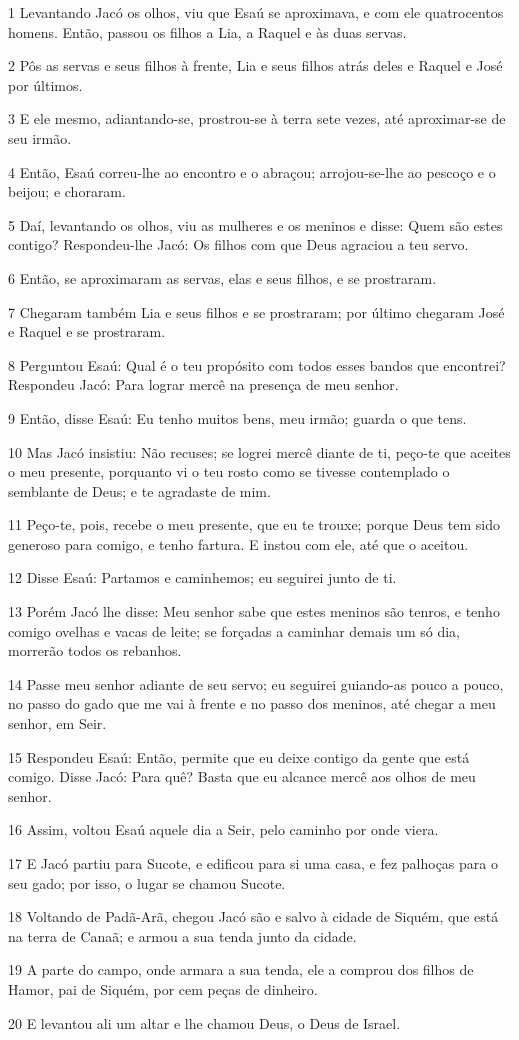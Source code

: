 \par 1 Levantando Jacó os olhos, viu que Esaú se aproximava, e com ele quatrocentos homens. Então, passou os filhos a Lia, a Raquel e às duas servas.
\par 2 Pôs as servas e seus filhos à frente, Lia e seus filhos atrás deles e Raquel e José por últimos.
\par 3 E ele mesmo, adiantando-se, prostrou-se à terra sete vezes, até aproximar-se de seu irmão.
\par 4 Então, Esaú correu-lhe ao encontro e o abraçou; arrojou-se-lhe ao pescoço e o beijou; e choraram.
\par 5 Daí, levantando os olhos, viu as mulheres e os meninos e disse: Quem são estes contigo? Respondeu-lhe Jacó: Os filhos com que Deus agraciou a teu servo.
\par 6 Então, se aproximaram as servas, elas e seus filhos, e se prostraram.
\par 7 Chegaram também Lia e seus filhos e se prostraram; por último chegaram José e Raquel e se prostraram.
\par 8 Perguntou Esaú: Qual é o teu propósito com todos esses bandos que encontrei? Respondeu Jacó: Para lograr mercê na presença de meu senhor.
\par 9 Então, disse Esaú: Eu tenho muitos bens, meu irmão; guarda o que tens.
\par 10 Mas Jacó insistiu: Não recuses; se logrei mercê diante de ti, peço-te que aceites o meu presente, porquanto vi o teu rosto como se tivesse contemplado o semblante de Deus; e te agradaste de mim.
\par 11 Peço-te, pois, recebe o meu presente, que eu te trouxe; porque Deus tem sido generoso para comigo, e tenho fartura. E instou com ele, até que o aceitou.
\par 12 Disse Esaú: Partamos e caminhemos; eu seguirei junto de ti.
\par 13 Porém Jacó lhe disse: Meu senhor sabe que estes meninos são tenros, e tenho comigo ovelhas e vacas de leite; se forçadas a caminhar demais um só dia, morrerão todos os rebanhos.
\par 14 Passe meu senhor adiante de seu servo; eu seguirei guiando-as pouco a pouco, no passo do gado que me vai à frente e no passo dos meninos, até chegar a meu senhor, em Seir.
\par 15 Respondeu Esaú: Então, permite que eu deixe contigo da gente que está comigo. Disse Jacó: Para quê? Basta que eu alcance mercê aos olhos de meu senhor.
\par 16 Assim, voltou Esaú aquele dia a Seir, pelo caminho por onde viera.
\par 17 E Jacó partiu para Sucote, e edificou para si uma casa, e fez palhoças para o seu gado; por isso, o lugar se chamou Sucote.
\par 18 Voltando de Padã-Arã, chegou Jacó são e salvo à cidade de Siquém, que está na terra de Canaã; e armou a sua tenda junto da cidade.
\par 19 A parte do campo, onde armara a sua tenda, ele a comprou dos filhos de Hamor, pai de Siquém, por cem peças de dinheiro.
\par 20 E levantou ali um altar e lhe chamou Deus, o Deus de Israel.

